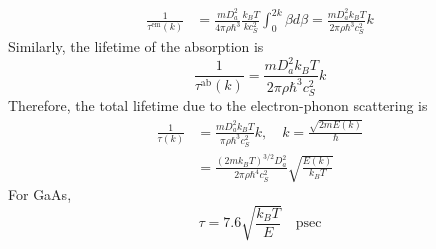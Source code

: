 \begin{align}
    \frac{1}{\tau^{\text{em}}(k)}& = \frac{mD_{a}^{2}}{4\pi\rho\hbar^{3}}\frac{k_{B}T}{kc_{S}^{2}}\int_{0}^{2k}\beta d\beta = \frac{mD_{a}^{2}k_{B}T}{2\pi\rho\hbar^{3}c_{S}^{2}}k
\end{align} Similarly, the lifetime of the absorption is \begin{equation}
    \frac{1}{\tau^{\text{ab}}(k)} = \frac{mD_{a}^{2}k_{B}T}{2\pi\rho\hbar^{3}c_{S}^{2}}k
\end{equation} Therefore, the total lifetime due to the electron-phonon scattering is \begin{align}
    \frac{1}{\tau(k)}& = \frac{mD_{a}^{2}k_{B}T}{\pi\rho\hbar^{3}c_{S}^{2}}k,\quad k=\frac{\sqrt{2mE(k)}}{\hbar}\nonumber\\
    & = \frac{(2mk_{B}T)^{3/2}D_{a}^{2}}{2\pi\rho\hbar^{4}c_{S}^{2}}\sqrt{\frac{E(k)}{k_{B}T}}
\end{align} For GaAs, \begin{equation}
    \tau = 7.6\sqrt{\frac{k_{B}T}{E}}\quad\text{psec}\nonumber
\end{equation}